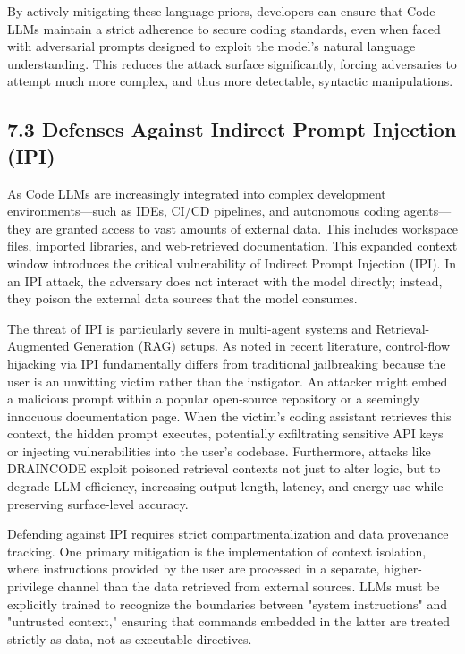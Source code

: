 \documentclass[11pt,a4paper]{article}
\begin{document}
By actively mitigating these language priors, developers can ensure that Code LLMs maintain a strict adherence to secure coding standards, even when faced with adversarial prompts designed to exploit the model's natural language understanding. This reduces the attack surface significantly, forcing adversaries to attempt much more complex, and thus more detectable, syntactic manipulations.

\subsection{7.3 Defenses Against Indirect Prompt Injection (IPI)}

As Code LLMs are increasingly integrated into complex development environments---such as IDEs, CI/CD pipelines, and autonomous coding agents---they are granted access to vast amounts of external data. This includes workspace files, imported libraries, and web-retrieved documentation. This expanded context window introduces the critical vulnerability of Indirect Prompt Injection (IPI). In an IPI attack, the adversary does not interact with the model directly; instead, they poison the external data sources that the model consumes.

The threat of IPI is particularly severe in multi-agent systems and Retrieval-Augmented Generation (RAG) setups. As noted in recent literature, control-flow hijacking via IPI fundamentally differs from traditional jailbreaking because the user is an unwitting victim rather than the instigator. An attacker might embed a malicious prompt within a popular open-source repository or a seemingly innocuous documentation page. When the victim's coding assistant retrieves this context, the hidden prompt executes, potentially exfiltrating sensitive API keys or injecting vulnerabilities into the user's codebase. Furthermore, attacks like DRAINCODE exploit poisoned retrieval contexts not just to alter logic, but to degrade LLM efficiency, increasing output length, latency, and energy use while preserving surface-level accuracy.

Defending against IPI requires strict compartmentalization and data provenance tracking. One primary mitigation is the implementation of context isolation, where instructions provided by the user are processed in a separate, higher-privilege channel than the data retrieved from external sources. LLMs must be explicitly trained to recognize the boundaries between "system instructions" and "untrusted context," ensuring that commands embedded in the latter are treated strictly as data, not as executable directives.
\end{document}

